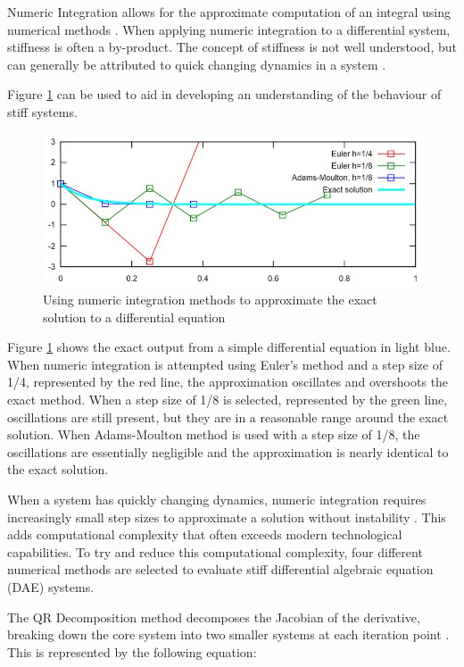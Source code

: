 Numeric Integration allows for the approximate computation of an integral using numerical methods \cite{WolframNumeric}.
When applying numeric integration to a differential system, stiffness is often a by-product.
The concept of stiffness is not well understood, but can generally be attributed to quick changing dynamics in a system \cite{StiffSystem}.
\par
Figure \ref{fig:stiffsystem} can be used to aid in developing an understanding of the behaviour of stiff systems. 
\begin{figure}[!htb]
	\centering
	\includegraphics[width=\linewidth]{stiffsystem.JPG}
	\caption{Using numeric integration methods to approximate the exact solution to a differential equation}\label{fig:stiffsystem}
	\endminipage
\end{figure}
Figure \ref{fig:stiffsystem} shows the exact output from a simple differential equation in light blue. 
When numeric integration is attempted using Euler's method and a step size of 1/4, represented by the red line, the approximation oscillates and overshoots the exact method.
When a step size of 1/8 is selected, represented by the green line, oscillations are still present, but they are in a reasonable range around the exact solution. 
When Adams-Moulton method is used with a step size of 1/8, the oscillations are essentially negligible and the approximation is nearly identical to the exact solution.


\par
When a system has quickly changing dynamics, numeric integration requires increasingly small step sizes to approximate a solution without instability \cite{StiffSystem}. 
This adds computational complexity that often exceeds modern technological capabilities. 
To try and reduce this computational complexity, four different numerical methods are selected to evaluate stiff differential algebraic equation (DAE) systems.

The QR Decomposition method decomposes the Jacobian of the derivative, breaking down the core system into two smaller systems at each iteration point \cite{Methods}.
This is represented by the following equation:

